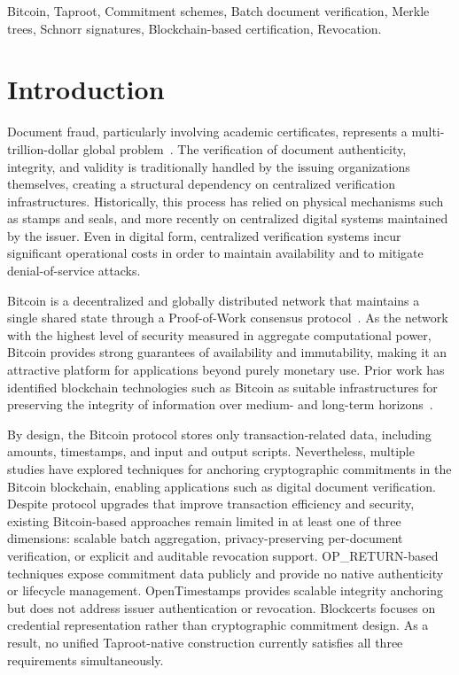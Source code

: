 \documentclass{ieeeaccess}
\begin{document}
\begin{keywords}
Bitcoin, Taproot, Commitment schemes, Batch document verification, Merkle trees, Schnorr signatures, Blockchain-based certification, Revocation.
\end{keywords}



\titlepgskip=-21pt

\maketitle


\section{Introduction}
\label{sec.intro}

Document fraud, particularly involving academic certificates, represents a multi-trillion-dollar global problem~\cite{Xie2020EthereumCertificate}.
The verification of document authenticity, integrity, and validity is traditionally handled by the issuing organizations themselves, creating a structural dependency on centralized verification infrastructures.
Historically, this process has relied on physical mechanisms such as stamps and seals, and more recently on centralized digital systems maintained by the issuer.
Even in digital form, centralized verification systems incur significant operational costs in order to maintain availability and to mitigate denial-of-service attacks.

Bitcoin is a decentralized and globally distributed network that maintains a single shared state through a Proof-of-Work consensus protocol~\cite{nakamoto2008bitcoin}.
As the network with the highest level of security measured in aggregate computational power, Bitcoin provides strong guarantees of availability and immutability, making it an attractive platform for applications beyond purely monetary use.
Prior work has identified blockchain technologies such as Bitcoin as suitable infrastructures for preserving the integrity of information over medium- and long-term horizons~\cite{Lemieux2016Trusting}.

By design, the Bitcoin protocol stores only transaction-related data, including amounts, timestamps, and input and output scripts.
Nevertheless, multiple studies have explored techniques for anchoring cryptographic commitments in the Bitcoin blockchain, enabling applications such as digital document verification.
Despite protocol upgrades that improve transaction efficiency and security, existing Bitcoin-based approaches remain limited in at least one of three dimensions: scalable batch aggregation, privacy-preserving per-document verification, or explicit and auditable revocation support.
OP_RETURN-based techniques expose commitment data publicly and provide no native authenticity or lifecycle management.
OpenTimestamps provides scalable integrity anchoring but does not address issuer authentication or revocation.
Blockcerts focuses on credential representation rather than cryptographic commitment design.
As a result, no unified Taproot-native construction currently satisfies all three requirements simultaneously.
\end{document}
